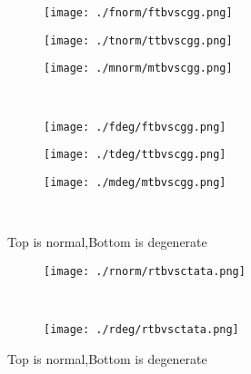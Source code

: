 \documentclass[aps,floats,floatfix,nofootinbib]{revtex4-1}
\begin{document}
\begin{center}
\begin{figure}
\begin{subfigure}{0.3\textwidth}
\texttt{[image: ./fnorm/ftbvscgg.png]}
\label{}
\end{subfigure}
\begin{subfigure}{0.3\textwidth}
\texttt{[image: ./tnorm/ttbvscgg.png]}
\label{}
\end{subfigure}
\begin{subfigure}{0.3\textwidth}
\texttt{[image: ./mnorm/mtbvscgg.png]}
\label{}
\end{subfigure}\\
\begin{subfigure}{0.3\textwidth}
\texttt{[image: ./fdeg/ftbvscgg.png]}
\label{}
\end{subfigure}
\begin{subfigure}{0.3\textwidth}
\texttt{[image: ./tdeg/ttbvscgg.png]}
\label{}
\end{subfigure}
\begin{subfigure}{0.3\textwidth}
\texttt{[image: ./mdeg/mtbvscgg.png]}
\label{}
\end{subfigure}\\
\caption{Top is normal,Bottom is degenerate}
\end{figure}
\end{center}

\begin{center}
\begin{figure}
\begin{subfigure}{0.95\textwidth}
\texttt{[image: ./rnorm/rtbvsctata.png]}
\label{}
\end{subfigure}\\
\begin{subfigure}{0.95\textwidth}
\texttt{[image: ./rdeg/rtbvsctata.png]}
\label{}
\end{subfigure}
\caption{Top is normal,Bottom is degenerate}
\end{figure}
\end{center}
\end{document}
